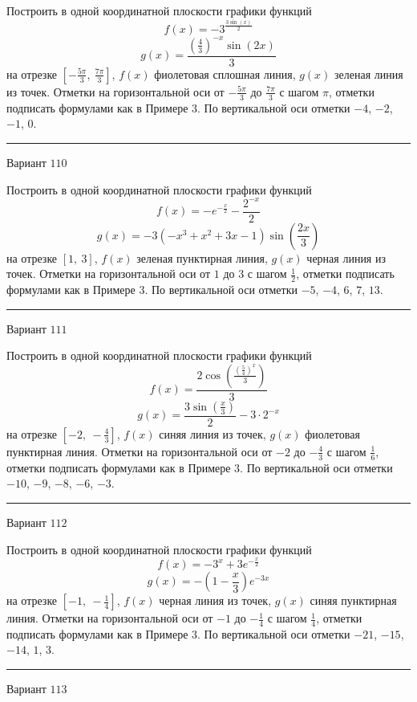 \documentclass[11pt]{report}
\begin{document}
Построить в одной координатной плоскости графики функций $$f(x) = - 3^{\frac{3 \sin{\left(x \right)}}{2}}$$ $$g(x) = \frac{\left(\frac{4}{3}\right)^{- x} \sin{\left(2 x \right)}}{3}$$ на отрезке $\left[- \frac{5 \pi}{3}, \  \frac{7 \pi}{3}\right]$, $f(x)$ фиолетовая сплошная линия, $g(x)$ зеленая линия из точек. Отметки на горизонтальной оси от $- \frac{5 \pi}{3}$ до $\frac{7 \pi}{3}$ с шагом $\pi$, отметки подписать формулами как в Примере 3. По вертикальной оси отметки $-4$, $-2$, $-1$, $0$.
\begin{center}
\noindent\rule{8cm}{0.4pt}
\end{center}
Вариант $110$


Построить в одной координатной плоскости графики функций $$f(x) = - e^{- \frac{x}{2}} - \frac{2^{- x}}{2}$$ $$g(x) = - 3 \left(- x^{3} + x^{2} + 3 x - 1\right) \sin{\left(\frac{2 x}{3} \right)}$$ на отрезке $\left[1, \  3\right]$, $f(x)$ зеленая пунктирная линия, $g(x)$ черная линия из точек. Отметки на горизонтальной оси от $1$ до $3$ с шагом $\frac{1}{2}$, отметки подписать формулами как в Примере 3. По вертикальной оси отметки $-5$, $-4$, $6$, $7$, $13$.
\begin{center}
\noindent\rule{8cm}{0.4pt}
\end{center}
Вариант $111$


Построить в одной координатной плоскости графики функций $$f(x) = \frac{2 \cos{\left(\frac{\left(\frac{5}{4}\right)^{x}}{3} \right)}}{3}$$ $$g(x) = \frac{3 \sin{\left(\frac{x}{3} \right)}}{2} - 3 \cdot 2^{- x}$$ на отрезке $\left[-2, \  - \frac{4}{3}\right]$, $f(x)$ синяя линия из точек, $g(x)$ фиолетовая пунктирная линия. Отметки на горизонтальной оси от $-2$ до $- \frac{4}{3}$ с шагом $\frac{1}{6}$, отметки подписать формулами как в Примере 3. По вертикальной оси отметки $-10$, $-9$, $-8$, $-6$, $-3$.
\begin{center}
\noindent\rule{8cm}{0.4pt}
\end{center}
Вариант $112$


Построить в одной координатной плоскости графики функций $$f(x) = - 3^{x} + 3 e^{- \frac{x}{2}}$$ $$g(x) = - \left(1 - \frac{x}{3}\right) e^{- 3 x}$$ на отрезке $\left[-1, \  - \frac{1}{4}\right]$, $f(x)$ черная линия из точек, $g(x)$ синяя пунктирная линия. Отметки на горизонтальной оси от $-1$ до $- \frac{1}{4}$ с шагом $\frac{1}{4}$, отметки подписать формулами как в Примере 3. По вертикальной оси отметки $-21$, $-15$, $-14$, $1$, $3$.
\begin{center}
\noindent\rule{8cm}{0.4pt}
\end{center}
Вариант $113$
\end{document}
